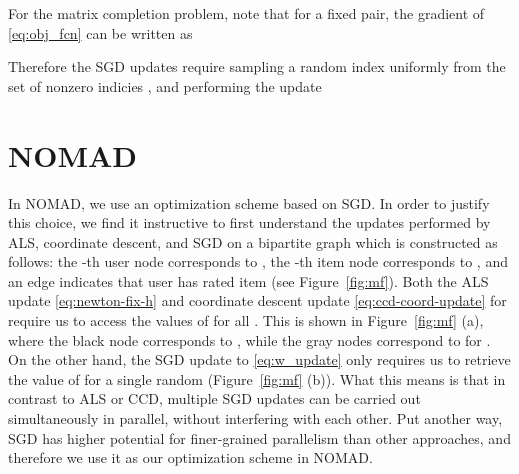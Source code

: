 \documentclass{vldb}
\begin{document}
For the matrix completion problem, note that for a fixed  pair,
the gradient of \eqref{eq:obj_fcn} can be written as 

Therefore the SGD updates require sampling a random index  uniformly from the set of nonzero indicies , and
performing the update


\section{NOMAD}
\label{sec:NOMAD}

In NOMAD, we use an optimization scheme based on SGD. In order to
justify this choice, we find it instructive to first understand the
updates performed by ALS, coordinate descent, and SGD on a bipartite
graph which is constructed as follows: the -th user node
corresponds to , the -th item node corresponds to
, and an edge  indicates that user  has rated item
 (see Figure~\ref{fig:mf}). Both the ALS update
\eqref{eq:newton-fix-h} and coordinate descent update
\eqref{eq:ccd-coord-update} for  require us to access the
values of  for all . This is shown in
Figure~\ref{fig:mf} (a), where the black node corresponds to
, while the gray nodes correspond to  for .  On the other hand, the SGD update to 
\eqref{eq:w_update} only requires us to retrieve the value of
 for a single random  (Figure~\ref{fig:mf}
(b)). What this means is that in contrast to ALS or CCD, multiple SGD
updates can be carried out simultaneously in parallel, without
interfering with each other.  Put another way, SGD has higher
potential for finer-grained parallelism than other approaches, and
therefore we use it as our optimization scheme in NOMAD.
\end{document}
